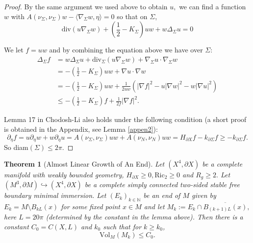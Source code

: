 \documentclass[12pt]{amsart}
\newcommand{\N}{\mathbb N}
\newcommand{\Ric}{\text{Ric}}
\newcommand{\dive}{\text{div}}
\newtheorem{theorem}{Theorem}[section]
\numberwithin{equation}{section}
\begin{document}
\begin{proof}
		By the same argument we used above to obtain $u,$ we can find a function  $w$ with $A (\nu_{\Sigma},\nu_{\Sigma})w-\langle \nabla_{\Sigma}w, \eta\rangle=0$ so that on $\Sigma$,
		\begin{equation*}
			\dive(u\nabla_{\Sigma} w)  +(\frac{1}{2}-K_{\Sigma})uw+ w\Delta_{\Sigma} u = 0
		\end{equation*}


		We let $f=uw$ and by combining the equation above we have over $\Sigma$: 
		\begin{align*}
			\Delta_{\Sigma} f & = w\Delta_{\Sigma} u +\dive_{\Sigma}(u\nabla_{\Sigma} w)+\nabla_{\Sigma} u \cdot \nabla_{\Sigma} w \\
			&= -(\frac{1}{2}-K_{\Sigma})uw+ \nabla u \cdot \nabla w \\
			&= -(\frac{1}{2}-K_{\Sigma})uw+ \frac{1}{2uw}(|\nabla f|^2-u|\nabla w|^2-w|\nabla u|^2)\\
			&\leq -(\frac{1}{2}-K_{\Sigma}) f+\frac{1}{2f} |\nabla f|^2.
		\end{align*}
		 
	Lemma 17 in Chodosh-Li \cite{ChodoLi2020-GeneralizedSoapBubbles} also holds under the following condition (a short proof is obtained in the Appendix, see Lemma \ref{appen2}):
		 \begin{equation*}
		 	\partial_{\eta}f=u\partial_{\eta}w+w\partial_{\eta}u=A(\nu_{\Sigma},\nu_{\Sigma})uw+A(\nu_N,\nu_N)uw=H_{\partial X}f-k_{\partial\Sigma}f\geq -k_{\partial \Sigma}f.
		 \end{equation*}
		 So diam$(\Sigma) \leq 2\pi$.
	\end{proof}


	\begin{theorem}[Almost Linear Growth of An End] \label{linearvol}
		Let $(X^4, \partial X)$ be a complete manifold with weakly bounded geometry, $H_{\partial X}\geq 0, \Ric_2 \geq 0$ and $R_g \geq 2.$ Let $(M^3,\partial M) \hookrightarrow (X^4,\partial X)$ be a complete simply connected two-sided stable free boundary minimal immersion. Let $(E_k)_{k \in \N}$ be an end of $M$ given by $E_k =M \setminus B_{kL}(x)$ for some fixed point $x \in M$ and let $M_k:= E_k \cap \overline{B_{(k+1)L}(x)},$ here $L=20\pi$ (determined by the constant in the lemma above). Then there is a constant $C_0=C(X,L)$ and $k_0$ such that for $k \geq k_0$, 
		\begin{equation*}
			\text{Vol}_M(M_k) \leq C_0.
		\end{equation*} 
	\end{theorem}
\end{document}
